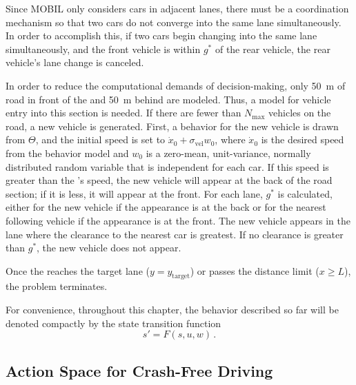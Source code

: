 Since MOBIL only considers cars in adjacent lanes, there must be a coordination mechanism so that two cars do not converge into the same lane simultaneously.
In order to accomplish this, if two cars begin changing into the same lane simultaneously, and the front vehicle is within $g^*$ of the rear vehicle, the rear vehicle's lane change is canceled.

In order to reduce the computational demands of decision-making, only \SI{50}{\meter} of road in front of the \av{} and \SI{50}{\meter} behind are modeled. %
Thus, a model for vehicle entry into this section is needed.
If there are fewer than $N_\text{max}$ vehicles on the road, a new vehicle is generated.
First, a behavior for the new vehicle is drawn from $\Theta$, and the initial speed is set to $\dot{x}_0 + \sigma_\text{vel} w_0$, where $\dot{x}_0$ is the desired speed from the behavior model and $w_0$ is a zero-mean, unit-variance, normally distributed random variable that is independent for each car.
If this speed is greater than the \av{}'s speed, the new vehicle will appear at the back of the road section; if it is less, it will appear at the front.
For each lane, $g^*$ is calculated, either for the new vehicle if the appearance is at the back or for the nearest following vehicle if the appearance is at the front.
The new vehicle appears in the lane where the clearance to the nearest car is greatest.
If no clearance is greater than $g^*$, the new vehicle does not appear.

Once the \av{} reaches the target lane ($y = y_\text{target}$) or passes the distance limit ($x \geq L$), the problem terminates.

For convenience, throughout this chapter, the behavior described so far will be denoted compactly by the state transition function
    \begin{equation}
        s' = F(s,u,w) \, \text{.}
    \end{equation}

\subsection{Action Space for Crash-Free Driving} \label{sec:action}

